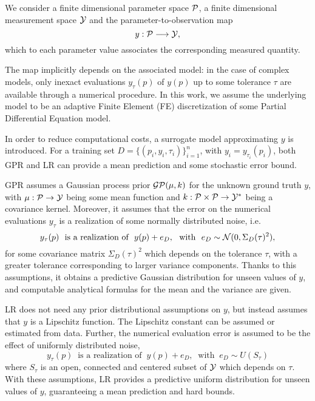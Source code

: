 We consider a finite dimensional parameter space $\mathcal P$, a finite dimensional measurement space $ \mathcal Y$ and the parameter-to-observation map 
\[
 y : \mathcal P \longrightarrow \mathcal Y, 
\]
which to each parameter value associates the corresponding measured quantity.

The map implicitly depends on the associated model: in the case of complex models, only inexact evaluations $y_\tau (p) $ of $ y(p)$ up to some tolerance $\tau$ are available through a numerical procedure. 
In this work, we assume the underlying model to be an adaptive Finite Element (FE) discretization of some Partial Differential Equation model. 

In order to reduce computational costs, a surrogate model approximating $y$ is introduced.
For a training set $D = \{(p_i,y_i,\tau_i)\}_{i=1}^n$, with $y_i = y_{\tau_i}(p_i)$, both GPR and LR can provide a mean prediction and some stochastic error bound. 

GPR assumes a Gaussian process prior $\mathcal G \mathcal P (\mu, k)$ for the unknown ground truth $y$, with $\mu : \mathcal P \rightarrow \mathcal Y$ being some mean function and $k: \mathcal P \times \mathcal P \rightarrow \mathcal Y^* $ being a covariance kernel.
Moreover, it assumes that the error on the numerical evaluations $y_\tau$ is a realization of some normally distributed noise, i.e. 
\begin{equation}\label{eq:GPR-noise}
    y_\tau(p) \ \text{ is a realization of } \ y(p) + e_D,  \ \text{ with } \ e_D \sim \mathcal N (0, \Sigma_D(\tau)^2),    
\end{equation}
for some covariance matrix $\Sigma_D(\tau)^2$ which depends on the tolerance $\tau$, with a greater tolerance corresponding to larger variance components.
Thanks to this assumptions, it obtains a predictive Gaussian distribution for unseen values of $y$, and computable analytical formulas for the mean and the variance are given.

LR does not need any prior distributional assumptions on $y$, but instead assumes that $y$ is a Lipschitz function.
The Lipschitz constant can be assumed or estimated from data.
Further, the numerical evaluation error is assumed to be the effect of uniformly distributed noise,  
\begin{equation}\label{eq:LR-noise}
    y_\tau(p) \ \text{ is a realization of } \ y(p) + e_D,  \ \text{ with } \ e_D \sim U(S_\tau )    
\end{equation}
where $S_\tau$ is an open, connected and centered subset of $\mathcal Y$ which depends on $\tau$.
With these assumptions, LR provides a predictive uniform distribution for unseen values of $y$, guaranteeing a mean prediction and hard bounds.


